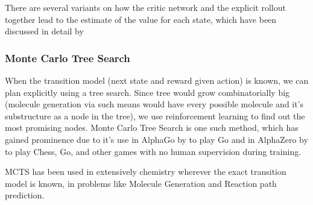 There are several variants on how the critic network and the explicit rollout together lead to the estimate of the value for each state, which have been discussed in detail by \cite{actor-critic-a2c, actor-critic-a3c, actor-critic-gae}

\subsubsection{Monte Carlo Tree Search}

When the transition model (next state and reward given action) is known, we can plan explicitly using a tree search. Since tree would grow combinatorially big (molecule generation via such means would have every possible molecule and it's substructure as a node in the tree), we use reinforcement learning to find out the most promising nodes. Monte Carlo Tree Search is one such method, which has gained prominence due to it's use in AlphaGo by \cite{mcts-alphago} to play Go and in AlphaZero by \cite{mcts-alphazero} to play Chess, Go, and other games with no human supervision during training. 

MCTS has been used in extensively chemistry wherever the exact transition model is known, in problems like Molecule Generation and Reaction path prediction. 





